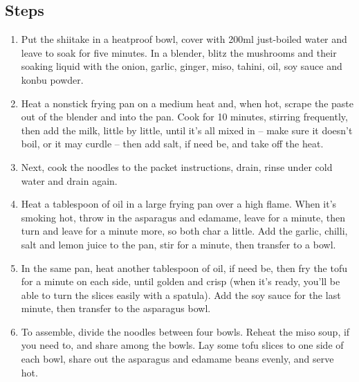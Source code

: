 \documentclass{book}
\begin{document}
\subsection*{Steps}
\begin{enumerate}
\item Put the shiitake in a heatproof bowl, cover with 200ml just-boiled water and leave to soak for five minutes. In a blender, blitz the mushrooms and their soaking liquid with the onion, garlic, ginger, miso, tahini, oil, soy sauce and konbu powder.
\item Heat a nonstick frying pan on a medium heat and, when hot, scrape the paste out of the blender and into the pan. Cook for 10 minutes, stirring frequently, then add the milk, little by little, until it’s all mixed in – make sure it doesn’t boil, or it may curdle – then add salt, if need be, and take off the heat.
\item Next, cook the noodles to the packet instructions, drain, rinse under cold water and drain again.
\item Heat a tablespoon of oil in a large frying pan over a high flame. When it’s smoking hot, throw in the asparagus and edamame, leave for a minute, then turn and leave for a minute more, so both char a little. Add the garlic, chilli, salt and lemon juice to the pan, stir for a minute, then transfer to a bowl.
\item In the same pan, heat another tablespoon of oil, if need be, then fry the tofu for a minute on each side, until golden and crisp (when it’s ready, you’ll be able to turn the slices easily with a spatula). Add the soy sauce for the last minute, then transfer to the asparagus bowl.
\item To assemble, divide the noodles between four bowls. Reheat the miso soup, if you need to, and share among the bowls. Lay some tofu slices to one side of each bowl, share out the asparagus and edamame beans evenly, and serve hot.
\end{enumerate}
\newpage
\end{document}
